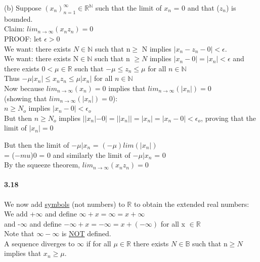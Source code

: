 \documentclass[10pt,letter]{article}
\begin{document}
(b) Suppose $(x_n)_{n=1}^\infty \in \mathbb{R}^\mathbb{N}$ such that the limit of $x_n$ = 0 and that ($z_n$) is bounded.\\
Claim: $lim_{n\rightarrow\infty}(x_nz_n) = 0$ \\ 
PROOF: let $\epsilon > 0$\\
We want: there exists $N \in \mathbb{N}$ such that n$\geq$ N implies $|x_n - z_n - 0| < \epsilon$.\\
We want: there exists N$\in \mathbb{N}$ such that n $\geq N$ implies $|x_n - 0| = |x_n| < \epsilon$ and there exists $0 < \mu \in \mathbb{R}$ such that $-\mu \leq z_n \leq \mu$ for all $n \in \mathbb{N}$\\
Thus $-\mu|x_n| \leq x_nz_n \leq \mu|x_n|$ for all $n \in \mathbb{N}$\\
Now because $lim_{n\rightarrow\infty}(x_n) = 0$ implies that $lim_{n\rightarrow\infty}(|x_n|) = 0$\\
(showing that $lim_{n\rightarrow\infty}(|x_n|) = 0$):\\
$n \geq N_o$ implies $|x_n - 0| < \epsilon_o$ \\
But then $n \geq N_o$ implies $||x_n| - 0| = ||x_n|| = |x_n| = |x_n - 0| < \epsilon_o$, proving that the limit of $|x_n| = 0$


But then the limit of $-\mu|x_n$ = $(-\mu)lim(|x_n|)$\\
= ($-mu$)0
= 0
and similarly the limit of $-\mu|x_n$ = 0\\
By the squeeze theorem, $lim_{n\rightarrow\infty}(x_nz_n) = 0$

\paragraph{3.18}
We now add \underline{symbols} (not numbers) to $\mathbb{R}$ to obtain the extended real numbers: \\
We add +$\infty$ and define $\infty + x = \infty = x + \infty$\\
and -$\infty$ and define $-\infty + x = -\infty = x + (-\infty)$ for all x $\in \mathbb{R}$\\
Note that $\infty - \infty$ is \underline{NOT} defined. \\ 
A sequence diverges to $\infty$ if for all $\mu \in \mathbb{R}$ there exists $N \in \mathbb{B}$ such that n$\geq N$ implies that $x_n \geq \mu$. 
\end{document}
